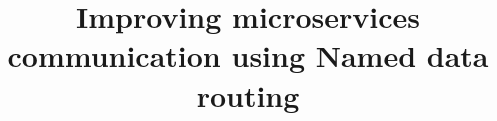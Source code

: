 \documentclass{IEEEtran}
\begin{document}
%
%
\title{Improving microservices communication using Named data routing}
%
%
\author{
}
%
\maketitle
%

%
%
%

%

%







\end{document}
